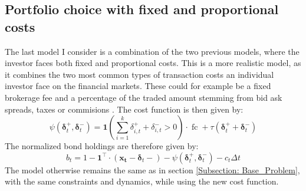 \documentclass[11pt]{article}
\begin{document}
\subsection{Portfolio choice with fixed and proportional costs}
The last model I consider is a combination of the two previous models, where the investor faces both fixed and proportional costs.
This is a more realistic model, as it combines the two most common types of transaction costs an individual investor 
face on the financial markets. These could for example be a fixed brokerage fee and a percentage of the traded amount stemming from bid ask spreads, taxes or commisions \autocite{Lesmond1999}.
The cost function is then given by:
\begin{equation}
  \label{eq:Fixed_Proportional_Cost_Function}
  \psi (\boldsymbol{\delta}^{+}_{t}, \boldsymbol{\delta}^{-}_{t} ) = \mathbf{1} \left(  \sum^{k}_{i=1} \delta^{+}_{i,t} + \delta^{-}_{i,t}  > 0 \right) \cdot \operatorname{fc} + \tau (\boldsymbol{\delta}^{+}_{t} + \boldsymbol{\delta}^{-}_{t})
\end{equation}
The normalized bond holdings are therefore given by:
\begin{equation}\label{eq: fx_bond_holdings}
  b_{t} = 1 - \mathbf{1}^{\top} \cdot (\mathbf{x_t} - \boldsymbol{\delta}_t -) - \psi( \boldsymbol{\delta}^{+}_{t}, \boldsymbol{\delta}^{-}_{t} ) - c_t \Delta t
\end{equation}
The model otherwise remains the same as in section \ref{Subsection: Base_Problem}, with the same constraints and dynamics, while using the new cost function.

\ifdefined\COMPILINGMAIN
\else
\printbibliography
\end{document}
